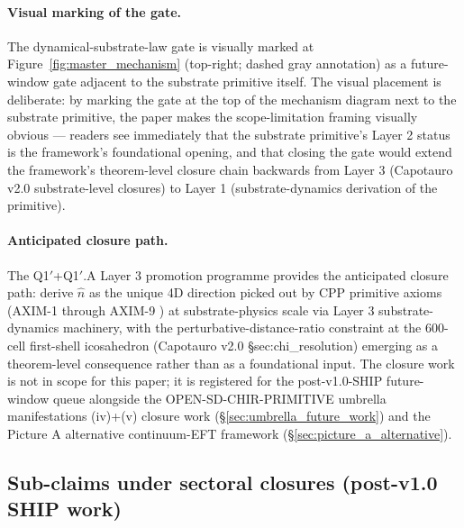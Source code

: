 \documentclass[11pt,letterpaper]{article}
\begin{document}
\paragraph{Visual marking of the gate.}
The dynamical-substrate-law gate is visually marked at Figure~\ref{fig:master_mechanism} (top-right; dashed gray annotation) as a future-window gate adjacent to the substrate primitive itself. The visual placement is deliberate: by marking the gate at the top of the mechanism diagram next to the substrate primitive, the paper makes the scope-limitation framing visually obvious — readers see immediately that the substrate primitive's Layer 2 status is the framework's foundational opening, and that closing the gate would extend the framework's theorem-level closure chain backwards from Layer 3 (Capotauro v2.0 substrate-level closures) to Layer 1 (substrate-dynamics derivation of the primitive).

\paragraph{Anticipated closure path.}
The Q1$'$+Q1$'$.A Layer 3 promotion programme \cite{ReviewerNotes} provides the anticipated closure path: derive $\hat{n}$ as the unique 4D direction picked out by CPP primitive axioms (AXIM-1 through AXIM-9 \cite{AxiomDocument}) at substrate-physics scale via Layer 3 substrate-dynamics machinery, with the perturbative-distance-ratio constraint at the 600-cell first-shell icosahedron (Capotauro v2.0 §sec:chi\_resolution) emerging as a theorem-level consequence rather than as a foundational input. The closure work is not in scope for this paper; it is registered for the post-v1.0-SHIP future-window queue alongside the OPEN-SD-CHIR-PRIMITIVE umbrella manifestations (iv)+(v) closure work (§\ref{sec:umbrella_future_work}) and the Picture A alternative continuum-EFT framework (§\ref{sec:picture_a_alternative}).

\subsection{Sub-claims under sectoral closures (post-v1.0 SHIP work)}
\label{sec:open_subclaims}
\end{document}
